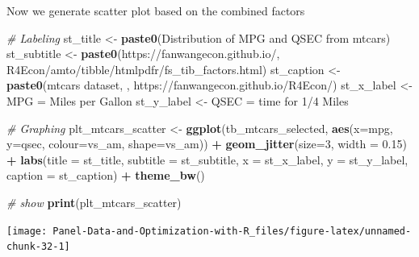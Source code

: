 \documentclass[
]{book}
\newenvironment{Shaded}{\begin{snugshade}}{\end{snugshade}}
\newcommand{\CommentTok}[1]{\textcolor[rgb]{0.56,0.35,0.01}{\textit{#1}}}
\newcommand{\DataTypeTok}[1]{\textcolor[rgb]{0.13,0.29,0.53}{#1}}
\newcommand{\DecValTok}[1]{\textcolor[rgb]{0.00,0.00,0.81}{#1}}
\newcommand{\FloatTok}[1]{\textcolor[rgb]{0.00,0.00,0.81}{#1}}
\newcommand{\KeywordTok}[1]{\textcolor[rgb]{0.13,0.29,0.53}{\textbf{#1}}}
\newcommand{\NormalTok}[1]{#1}
\newcommand{\OperatorTok}[1]{\textcolor[rgb]{0.81,0.36,0.00}{\textbf{#1}}}
\newcommand{\StringTok}[1]{\textcolor[rgb]{0.31,0.60,0.02}{#1}}
\begin{document}
Now we generate scatter plot based on the combined factors

\begin{Shaded}
\begin{Highlighting}[]
\CommentTok{\# Labeling}
\NormalTok{st\_title \textless{}{-}}\StringTok{ }\KeywordTok{paste0}\NormalTok{(}\StringTok{\textquotesingle{}Distribution of MPG and QSEC from mtcars\textquotesingle{}}\NormalTok{)}
\NormalTok{st\_subtitle \textless{}{-}}\StringTok{ }\KeywordTok{paste0}\NormalTok{(}\StringTok{\textquotesingle{}https://fanwangecon.github.io/\textquotesingle{}}\NormalTok{,}
                      \StringTok{\textquotesingle{}R4Econ/amto/tibble/htmlpdfr/fs\_tib\_factors.html\textquotesingle{}}\NormalTok{)}
\NormalTok{st\_caption \textless{}{-}}\StringTok{ }\KeywordTok{paste0}\NormalTok{(}\StringTok{\textquotesingle{}mtcars dataset, \textquotesingle{}}\NormalTok{,}
                     \StringTok{\textquotesingle{}https://fanwangecon.github.io/R4Econ/\textquotesingle{}}\NormalTok{)}
\NormalTok{st\_x\_label \textless{}{-}}\StringTok{ \textquotesingle{}MPG = Miles per Gallon\textquotesingle{}}
\NormalTok{st\_y\_label \textless{}{-}}\StringTok{ \textquotesingle{}QSEC = time for 1/4 Miles\textquotesingle{}}

\CommentTok{\# Graphing}
\NormalTok{plt\_mtcars\_scatter \textless{}{-}}\StringTok{ }
\StringTok{  }\KeywordTok{ggplot}\NormalTok{(tb\_mtcars\_selected, }
         \KeywordTok{aes}\NormalTok{(}\DataTypeTok{x=}\NormalTok{mpg, }\DataTypeTok{y=}\NormalTok{qsec, }\DataTypeTok{colour=}\NormalTok{vs\_am, }\DataTypeTok{shape=}\NormalTok{vs\_am)) }\OperatorTok{+}
\StringTok{  }\KeywordTok{geom\_jitter}\NormalTok{(}\DataTypeTok{size=}\DecValTok{3}\NormalTok{, }\DataTypeTok{width =} \FloatTok{0.15}\NormalTok{) }\OperatorTok{+}
\StringTok{  }\KeywordTok{labs}\NormalTok{(}\DataTypeTok{title =}\NormalTok{ st\_title, }\DataTypeTok{subtitle =}\NormalTok{ st\_subtitle,}
       \DataTypeTok{x =}\NormalTok{ st\_x\_label, }\DataTypeTok{y =}\NormalTok{ st\_y\_label, }\DataTypeTok{caption =}\NormalTok{ st\_caption) }\OperatorTok{+}
\StringTok{  }\KeywordTok{theme\_bw}\NormalTok{()}

\CommentTok{\# show}
\KeywordTok{print}\NormalTok{(plt\_mtcars\_scatter)}
\end{Highlighting}
\end{Shaded}

\begin{center}\texttt{[image: Panel-Data-and-Optimization-with-R\_files/figure-latex/unnamed-chunk-32-1]} \end{center}
\end{document}
